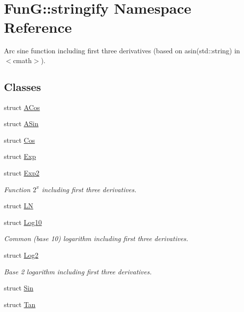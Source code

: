 \hypertarget{namespaceFunG_1_1stringify}{\section{Fun\-G\-:\-:stringify Namespace Reference}
\label{namespaceFunG_1_1stringify}
}


Arc sine function including first three derivatives (based on asin(std\-::string) in $<$cmath$>$).  


\subsection*{Classes}
\begin{DoxyCompactItemize}
\item 
struct \hyperlink{structFunG_1_1stringify_1_1ACos}{A\-Cos}
\item 
struct \hyperlink{structFunG_1_1stringify_1_1ASin}{A\-Sin}
\item 
struct \hyperlink{structFunG_1_1stringify_1_1Cos}{Cos}
\item 
struct \hyperlink{structFunG_1_1stringify_1_1Exp}{Exp}
\item 
struct \hyperlink{structFunG_1_1stringify_1_1Exp2}{Exp2}
\begin{DoxyCompactList}\small\item\em Function $2^x$ including first three derivatives. \end{DoxyCompactList}\item 
struct \hyperlink{structFunG_1_1stringify_1_1LN}{L\-N}
\item 
struct \hyperlink{structFunG_1_1stringify_1_1Log10}{Log10}
\begin{DoxyCompactList}\small\item\em Common (base 10) logarithm including first three derivatives. \end{DoxyCompactList}\item 
struct \hyperlink{structFunG_1_1stringify_1_1Log2}{Log2}
\begin{DoxyCompactList}\small\item\em Base 2 logarithm including first three derivatives. \end{DoxyCompactList}\item 
struct \hyperlink{structFunG_1_1stringify_1_1Sin}{Sin}
\item 
struct \hyperlink{structFunG_1_1stringify_1_1Tan}{Tan}
\end{DoxyCompactItemize}
